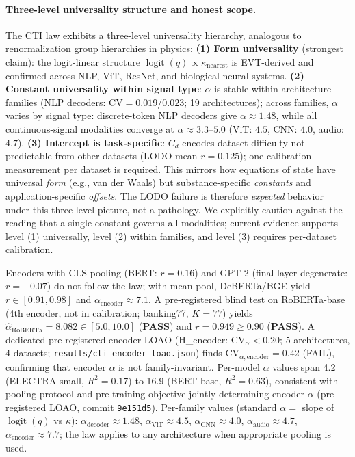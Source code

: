 \documentclass{article}
\DeclareMathOperator{\logit}{logit}
\begin{document}
\paragraph{Three-level universality structure and honest scope.}
The CTI law exhibits a three-level universality hierarchy, analogous to renormalization group hierarchies in physics:
\textbf{(1) Form universality} (strongest claim): the logit-linear structure $\logit(q)\propto\kappa_{\mathrm{nearest}}$ is EVT-derived and confirmed across NLP, ViT, ResNet, and biological neural systems.
\textbf{(2) Constant universality within signal type}: $\alpha$ is stable within architecture families (NLP decoders: CV$=0.019$/$0.023$; 19 architectures); across families, $\alpha$ varies by signal type: discrete-token NLP decoders give $\alpha\approx1.48$, while all continuous-signal modalities converge at $\alpha\approx3.3$--$5.0$ (ViT: $4.5$, CNN: $4.0$, audio: $4.7$).
\textbf{(3) Intercept is task-specific}: $C_d$ encodes dataset difficulty not predictable from other datasets (LODO mean $r=0.125$); one calibration measurement per dataset is required.
This mirrors how equations of state have universal \emph{form} (e.g., van der Waals) but substance-specific \emph{constants} and application-specific \emph{offsets}. The LODO failure is therefore \emph{expected} behavior under this three-level picture, not a pathology.
We explicitly caution against the reading that a single constant governs all modalities; current evidence supports level (1) universally, level (2) within families, and level (3) requires per-dataset calibration.

Encoders with CLS pooling (BERT: $r=0.16$) and GPT-2 (final-layer degenerate: $r=-0.07$) do not follow the law; with mean-pool, DeBERTa/BGE yield $r\in[0.91,0.98]$ and $\alpha_\mathrm{encoder}\approx7.1$.
A pre-registered blind test on RoBERTa-base (4th encoder, not in calibration; banking77, $K=77$) yields $\hat\alpha_\mathrm{RoBERTa}=8.082\in[5.0,10.0]$ (\textbf{PASS}) and $r=0.949\geq0.90$ (\textbf{PASS}).
A dedicated pre-registered encoder LOAO (H\_encoder: CV$_\alpha < 0.20$; 5 architectures, 4 datasets; \texttt{results/cti\_encoder\_loao.json}) finds $\mathrm{CV}_{\alpha,\mathrm{encoder}}=0.42$ (FAIL), confirming that encoder $\alpha$ is not family-invariant. Per-model $\alpha$ values span 4.2 (ELECTRA-small, $R^2=0.17$) to 16.9 (BERT-base, $R^2=0.63$), consistent with pooling protocol and pre-training objective jointly determining encoder $\alpha$ (pre-registered LOAO, commit \texttt{9e151d5}).
Per-family values (standard $\alpha=$ slope of $\logit(q)$ vs $\kappa$): $\alpha_\mathrm{decoder}\approx1.48$, $\alpha_\mathrm{ViT}\approx4.5$, $\alpha_\mathrm{CNN}\approx4.0$, $\alpha_\mathrm{audio}\approx4.7$, $\alpha_\mathrm{encoder}\approx7.7$; the law applies to any architecture when appropriate pooling is used.
\end{document}
